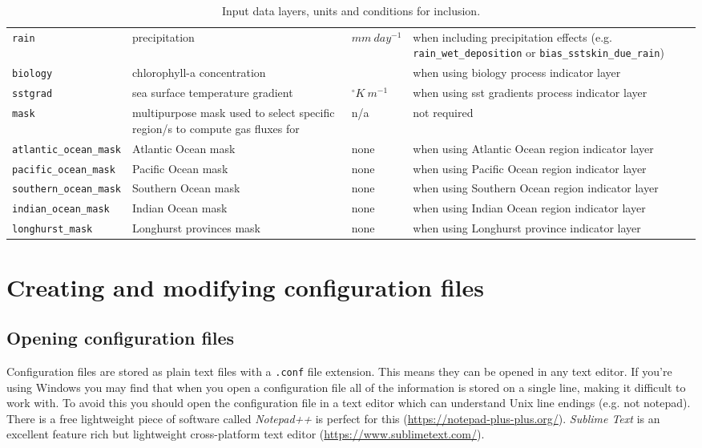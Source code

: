 \documentclass[]{scrartcl}
\begin{document}
\begin{table}
\begin{tabular}{|p{4cm}|p{5cm}|p{2cm}|p{5cm}|}
		\texttt{rain} & precipitation & $mm~day^{-1}$ & when including precipitation effects (e.g. \texttt{rain\_wet\_deposition} or \texttt{bias\_sstskin\_due\_rain})\\
		
		\texttt{biology} & chlorophyll-a concentration & ~ & when using biology process indicator layer \\
		\texttt{sstgrad} & sea surface temperature gradient & $^{\circ}K~m^{-1}$ & when using sst gradients process indicator layer \\
		
		\texttt{mask} & multipurpose mask used to select specific region/s to compute gas fluxes for & n/a & not required \\
		
		\texttt{atlantic\_ocean\_mask} & Atlantic Ocean mask & none & when using Atlantic Ocean region indicator layer \\
		\texttt{pacific\_ocean\_mask} & Pacific Ocean mask & none & when using Pacific Ocean region indicator layer \\
		\texttt{southern\_ocean\_mask} & Southern Ocean mask & none & when using Southern Ocean region indicator layer \\
		\texttt{indian\_ocean\_mask} & Indian Ocean mask & none & when using Indian Ocean region indicator layer \\
		\texttt{longhurst\_mask} & Longhurst provinces mask & none & when using Longhurst province indicator layer \\
	\end{tabular}
	\caption{Input data layers, units and conditions for inclusion.}
	\label{input_datalayers_table}
\end{table}


\clearpage{}


\section{Creating and modifying configuration files}
\subsection{Opening configuration files}
Configuration files are stored as plain text files with a \texttt{.conf} file extension. This means they can be opened in any text editor. If you're using Windows you may find that when you open a configuration file all of the information is stored on a single line, making it difficult to work with. To avoid this you should open the configuration file in a text editor which can understand Unix line endings (e.g. not notepad). There is a free lightweight piece of software called \textit{Notepad++} is perfect for this (\url{https://notepad-plus-plus.org/}). \textit{Sublime Text} is an excellent feature rich but lightweight cross-platform text editor (\url{https://www.sublimetext.com/}).
\end{document}
